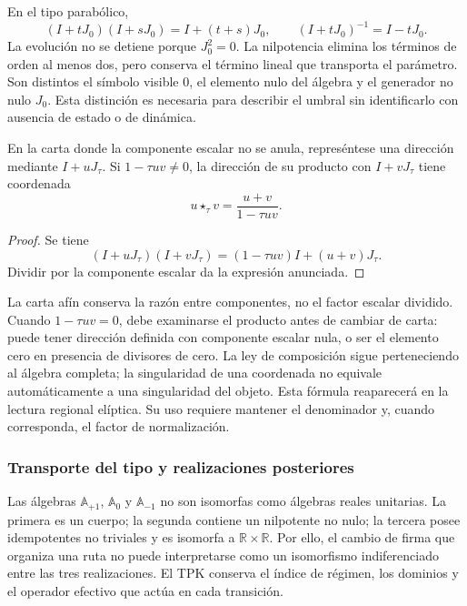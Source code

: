 En el tipo parabólico,
\[
 (I+tJ_0)(I+sJ_0)=I+(t+s)J_0,\qquad
 (I+tJ_0)^{-1}=I-tJ_0.
\]
La evolución no se detiene porque \(J_0^2=0\). La nilpotencia elimina los
términos de orden al menos dos, pero conserva el término lineal que
transporta el parámetro. Son distintos el símbolo visible \(0\), el
elemento nulo del álgebra y el generador no nulo \(J_0\). Esta distinción
es necesaria para describir el umbral sin identificarlo con ausencia de
estado o de dinámica.

\begin{proposition}
\label{x_reciprocidad:trit-ampl-prop-pendientes}
En la carta donde la componente escalar no se anula, represéntese una
dirección mediante \(I+uJ_\tau\). Si \(1-\tau uv\ne0\), la dirección de su
producto con \(I+vJ_\tau\) tiene coordenada
\[
 u\star_\tau v=\frac{u+v}{1-\tau uv}.
\]
\end{proposition}
\begin{proof}
Se tiene
\[
 (I+uJ_\tau)(I+vJ_\tau)
   =(1-\tau uv)I+(u+v)J_\tau.
\]
Dividir por la componente escalar da la expresión anunciada.
\end{proof}

La carta afín conserva la razón entre componentes, no el factor escalar
dividido. Cuando \(1-\tau uv=0\), debe examinarse el producto antes de
cambiar de carta: puede tener dirección definida con componente escalar
nula, o ser el elemento cero en presencia de divisores de cero. La ley de
composición sigue perteneciendo al álgebra completa; la singularidad de
una coordenada no equivale automáticamente a una singularidad del objeto.
Esta fórmula reaparecerá en la lectura regional elíptica. Su uso requiere
mantener el denominador y, cuando corresponda, el factor de normalización.

\subsubsection{Transporte del tipo y realizaciones posteriores}
\label{x_reciprocidad:trit-ampl-puentes}

Las álgebras \(\mathbb A_{+1}\), \(\mathbb A_0\) y
\(\mathbb A_{-1}\) no son isomorfas como álgebras reales unitarias.
La primera es un cuerpo; la segunda contiene un nilpotente no nulo; la
tercera posee idempotentes no triviales y es isomorfa a
\(\mathbb R\times\mathbb R\). Por ello, el cambio de firma que organiza una
ruta no puede interpretarse como un isomorfismo indiferenciado entre las
tres realizaciones. El TPK conserva el índice de régimen, los dominios y el
operador efectivo que actúa en cada transición.

